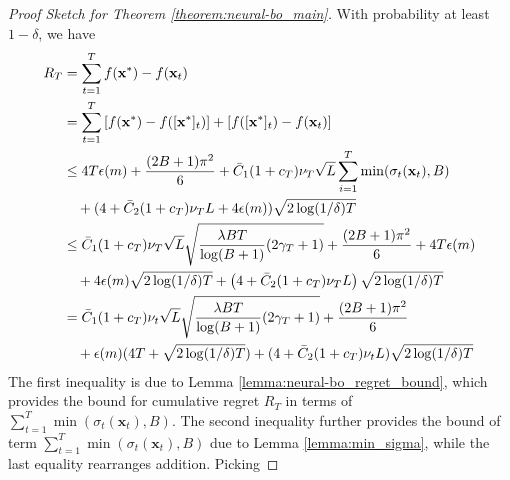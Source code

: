 


\begin{proof} [Proof Sketch for Theorem \ref{theorem:neural-bo_main}]
\label{proof:theorem_main}
With probability at least $1-\delta$, we have
\begin{align*}
 R_T &  = \sum^T_{t=1} f(\mathbf{x^*}) - f(\mathbf{x}_t) \\ 
     & = \sum^T_{t=1} \left[f(\mathbf{x}^*) - f([\mathbf{x}^*]_t)\right] + \left[f([\mathbf{x}^*]_t) - f(\mathbf{x}_t) \right] \\ 
     &\leq 4T \epsilon(m) + \frac{(2B+1)\pi^2}{6} + \Bar{C}_1(1+c_T)\nu_T \sqrt{L} \sum^T_{i=1} \min(\sigma_t(\mathbf{x}_t), B) \\
     & \quad +(4+\Bar{C}_2(1+c_T)\nu_T L + 4\epsilon(m))\sqrt{2 \log(1/\delta)T} \\
     & \leq \Bar{C}_1 (1+c_T)\nu_T \sqrt{L} \sqrt{\frac{\lambda BT}{\log(B+1)} (2\gamma_T+1)} 
     + \frac{(2B+1)\pi^2}{6} + 4T \epsilon(m) \\
     & \quad + 4\epsilon(m)\sqrt{2 \log(1/\delta)T}  +  \left(4+\Bar{C}_2(1+c_T)\nu_T L\right)\sqrt{2 \log(1/\delta)T}  \\
     &  = \Bar{C}_1(1+c_T)\nu_t \sqrt{L} \sqrt{\frac{\lambda BT}{\log(B+1)} (2\gamma_T+1)} + \frac{(2B+1)\pi^2}{6} \\
     & \quad +  \epsilon(m)(4T+ \sqrt{2 \log(1/\delta)T}) + (4+\Bar{C}_2(1+c_T)\nu_t L)\sqrt{2 \log(1/\delta)T} \\
     \end{align*} 
The first inequality is due to Lemma \ref{lemma:neural-bo_regret_bound}, which provides the bound for cumulative regret $R_T$ in terms of $\sum^T_{t=1} \min(\sigma_t(\mathbf{x}_t),B)$.  The second inequality further provides the bound of term $\sum^T_{t=1} \min(\sigma_t(\mathbf{x}_t),B)$ due to Lemma \ref{lemma:min_sigma}, while the last equality rearranges addition.  Picking

\end{proof}
